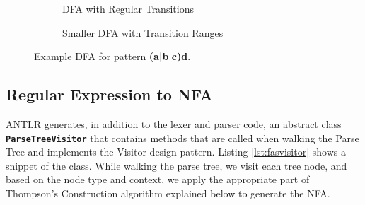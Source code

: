 \begin{figure}[htpb]
\begin{subfigure}[b]{\textwidth}
\centering
{}
\caption{DFA with Regular Transitions}
\label{fig:automatonrangea}
\end{subfigure}
\par\bigskip
\begin{subfigure}[b]{\textwidth}
\centering
{}
\caption{Smaller DFA with Transition Ranges}
\label{fig:automatonrangeb}

\end{subfigure}
\caption{Example DFA for pattern \textbf{(a|b|c)d}.}\label{fig:automatonrange}
\end{figure}

\subsection{Regular Expression to NFA}\label{subsection:regexnfa}
ANTLR generates, in addition to the lexer and parser code, an abstract class \texttt{\textbf{ParseTreeVisitor}} that contains methods that are called when walking the Parse Tree and implements the Visitor design pattern. Listing \ref{lst:fasvisitor} shows a snippet of the class. While walking the parse tree, we visit each tree node, and based on the node type and context, we apply the appropriate part of Thompson's Construction algorithm explained below to generate the NFA.

